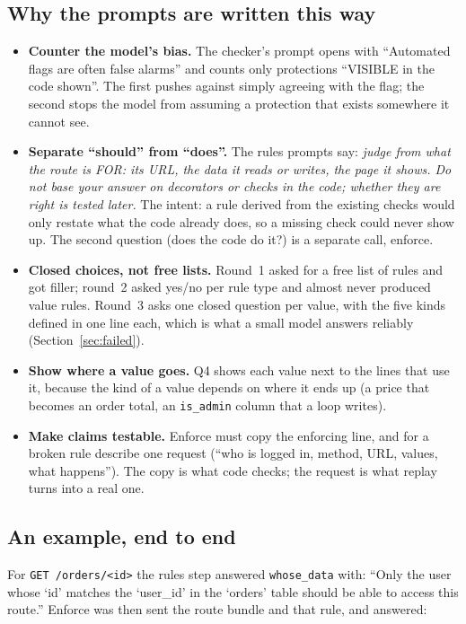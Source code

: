 \documentclass[11pt,a4paper]{article}
\newcommand{\code}[1]{\texttt{#1}}
\begin{document}
\subsection{Why the prompts are written this way}
\begin{itemize}
  \item \textbf{Counter the model's bias.} The checker's prompt opens with ``Automated flags are often false
        alarms'' and counts only protections ``VISIBLE in the code shown''. The first pushes against simply agreeing
        with the flag; the second stops the model from assuming a protection that exists somewhere it cannot see.
  \item \textbf{Separate ``should'' from ``does''.} The rules prompts say: \emph{judge from what the route is FOR: its
        URL, the data it reads or writes, the page it shows. Do not base your answer on decorators or checks in the
        code; whether they are right is tested later.} The intent: a rule derived from the existing checks would only
        restate what the code already does, so a missing check could never show up. The second question (does the code
        do it?) is a separate call, enforce.
  \item \textbf{Closed choices, not free lists.} Round~1 asked for a free list of rules and got filler; round~2 asked
        yes/no per rule type and almost never produced value rules. Round~3 asks one closed question per value, with
        the five kinds defined in one line each, which is what a small model answers reliably
        (Section~\ref{sec:failed}).
  \item \textbf{Show where a value goes.} Q4 shows each value next to the lines that use it, because the kind of a
        value depends on where it ends up (a price that becomes an order total, an \code{is\_admin} column that a loop
        writes).
  \item \textbf{Make claims testable.} Enforce must copy the enforcing line, and for a broken rule describe one
        request (``who is logged in, method, URL, values, what happens''). The copy is what code checks; the request
        is what replay turns into a real one.
\end{itemize}

\subsection{An example, end to end}
For \code{GET /orders/<id>} the rules step answered \code{whose\_data} with: ``Only the user whose `id' matches the
`user\_id' in the `orders' table should be able to access this route.'' Enforce was then sent the route bundle and
that rule, and answered:
\end{document}
